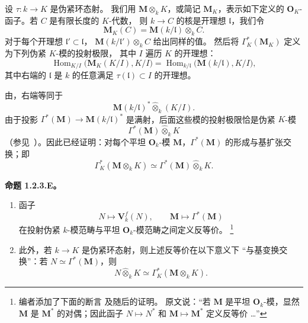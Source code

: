 设 \(\tau:k\longrightarrow K\) 是伪紧环态射。
我们用 \(\mathbf M\otimes_kK\)，或简记 \(\mathbf M_K\)，表示如下定义的
\(\mathbf O_K\)-函子。若 \(C\) 是有限长度的 \(K\)-代数，
则 \(k\longrightarrow C\) 的核是开理想 \(\mathfrak l\)，我们令
\[
  \mathbf M_K(C)
  =
  \mathbf M(k/\mathfrak l)\otimes_k C.
\]
对于每个开理想 \(\mathfrak l'\subset\mathfrak l\)，
\(\mathbf M(k/\mathfrak l')\otimes_kC\) 给出同样的值。
然后将 \(\Gamma_K^*(\mathbf M_K)\) 定义为下列伪紧 \(K\)-模的投射极限，
其中 \(I\) 遍历 \(K\) 的开理想：
\[
  \operatorname{Hom}_{K/I}\bigl(\mathbf M_K(K/I),K/I\bigr)
  =
  \operatorname{Hom}_{k/\mathfrak l}
    \bigl(\mathbf M(k/\mathfrak l),K/I\bigr),
\]
其中右端的 \(\mathfrak l\) 是 \(k\) 的任意满足 \(\tau(\mathfrak l)\subset I\) 的开理想。

由，右端等同于
\[
  \mathbf M(k/\mathfrak l)^*
  \widehat{\otimes}_k(K/I).
\]
由于投影 \(\Gamma^*(\mathbf M)\longrightarrow\mathbf M(k/\mathfrak l)^*\)
是满射，后面这些模的投射极限恰是伪紧 \(K\)-模
\[
  \Gamma^*(\mathbf M)\widehat{\otimes}_kK
\]
（参见\ ）。因此已经证明：对每个平坦
\(\mathbf O_k\)-模 \(\mathbf M\)，\(\Gamma^*(\mathbf M)\) 的形成与基扩张交换；即
\begin{equation}
  \Gamma_K^*(\mathbf M\otimes_kK)
  \simeq
  \Gamma^*(\mathbf M)\widehat{\otimes}_kK.
  \tag{\(\star\)}
  \label{sga3:VIIB:1.2.3:star}
\end{equation}

\medskip
\noindent\textbf{命题 1.2.3.E。}
\label{sga3:VIIB:1.2.3.E}
{\itshape
\begin{enumerate}
  \item[\textup{(i)}]
  函子
  \[
    N\longmapsto\mathbf V_k^f(N),
    \qquad
    \mathbf M\longmapsto\Gamma^*(\mathbf M)
  \]
  在投射伪紧 \(k\)-模范畴与平坦 \(\mathbf O_k\)-模范畴之间定义反等价。
  \footnote{\label{sga3:VIIB:nde:48}编者添加了下面的断言
  \textup{} 及随后的证明。
  原文说：“若 \(\mathbf M\) 是平坦 \(\mathbf O_k\)-模，显然 \(\mathbf M\)
  是 \(\mathbf M^*\) 的对偶；因此函子 \(N\mapsto N^*\) 和
  \(\mathbf M\mapsto\mathbf M^*\) 定义反等价 \ldots”}

  \item[\textup{(ii)}]
  此外，若 \(k\longrightarrow K\) 是伪紧环态射，则上述反等价在以下意义下
  “与基变换交换”：若 \(N\simeq\Gamma^*(\mathbf M)\)，则
  \[
    N\widehat{\otimes}_kK
    \simeq
    \Gamma_K^*(\mathbf M\otimes_kK).
  \]
\end{enumerate}}

